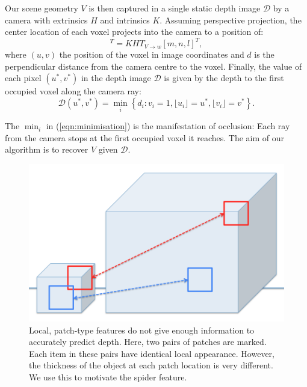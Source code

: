 \documentclass[10pt,twocolumn,letterpaper]{article}
\newcommand{\rgbdimage}{\mathcal{D}}
\newcommand{\intrinsics}{K}
\newcommand{\voxelgrid}{V}
\newcommand{\voxidx}{i}
\newcommand{\voxelidxs}{m, n, l}
\newcommand{\trans}{T}
\newcommand{\extrinsics}{H}
\newcommand{\voxelgridtoworld}{\trans_{\voxelgrid \rightarrow w}}
\begin{document}
Our scene geometry $\voxelgrid$ is then captured in a single static depth image $\rgbdimage$ by a camera with extrinsics $\extrinsics$ and intrinsics $\intrinsics$. 
Assuming perspective projection, the center location of each voxel projects into the camera to a position of:
\begin{equation}
[u, v, d]^T = \intrinsics \extrinsics \voxelgridtoworld [\voxelidxs]^T,
\end{equation}
where $(u,v)$ the position of the voxel in image coordinates and $d$ is the  perpendicular distance from the camera centre to the voxel.
Finally, the value of each pixel $(u^*, v^*)$ in the depth image $\rgbdimage$ is given by the depth to the first occupied voxel along the camera ray:
\begin{equation}
\rgbdimage(u^*,v^*) = \min_\voxidx \left\{ d_{\voxidx} : v_{\voxidx} = 1, \lfloor u_{\voxidx} \rfloor = u^*, \lfloor v_{\voxidx} \rfloor = v^* \right\}.
\label{eqn:minimisation}
\end{equation}

The $\min_\voxidx$ in (\ref{eqn:minimisation}) is the manifestation of occlusion: Each ray from the camera stops at the first occupied voxel it reaches.
The aim of our algorithm is to recover $\voxelgrid$ given $\rgbdimage$.




\begin{figure}
  \centering 
  \includegraphics[width=0.9\columnwidth]{patch_sizes.png}
      
  \caption{Local, patch-type features do not give enough information to accurately predict depth. Here, two pairs of patches are marked. Each item in these pairs have identical local appearance. However, the thickness of the object at each patch location is very different. We use this to motivate the spider feature.}
\end{figure}
\end{document}
